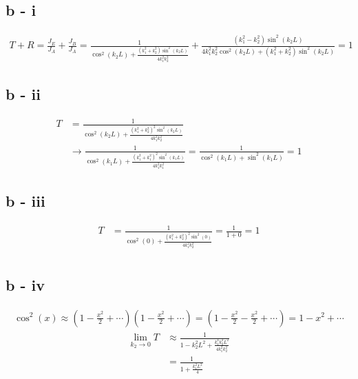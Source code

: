 \documentclass[letter, 10pts]{article}
\begin{document}
\subsection*{b - i}
\begin{align*}
	T + R = \frac{J_E}{J_A} + \frac{J_B}{J_A} =
\frac{1}{
\cos ^2 (k_2 L) 
+ 
\frac{
	(k_1 ^2 + k_2^2) \sin ^2 (k_2 L)
}{4 k_1 ^2 k_2 ^2}
}+ 
\frac{
	(k_1^2 - k_2^2) \sin ^2(k_2 L) 
}{4 k_1 ^2 k_2 ^2 
\cos ^2 (k_2 L) + 
(k_1 ^2 + k_2 ^2) \sin ^2(k_2 L)} = 1
\end{align*}


\subsection*{b - ii} 
\begin{align*}
	T &= 
\frac{1}{
\cos ^2 (k_2 L) 
+ 
\frac{
	(k_1 ^2 + k_2^2)^2 \sin ^2 (k_2 L)
}{4 k_1 ^2 k_2 ^2}
}
	\\ 
	&\to 
\frac{1}{
\cos ^2 (k_1 L) 
+ 
\frac{
	(k_1 ^2 + k_1^2) ^2 \sin ^2 (k_1 L)
}{4 k_1 ^2 k_1 ^2}
} = 
\frac{1}{\cos^2 (k_1 L) + \sin ^2 (k_1 L)} = 1
\end{align*}

\subsection*{b - iii} 
\begin{align*}
T &= \frac{1}{
\cos ^2(0) + \frac{(k_1 ^2 + k_2 ^2) ^2 \sin ^2 (0 ) }{4 k_1 ^2 k_2 ^2}} = \frac{1}{1+ 0} = 1
 \\
\end{align*}


\subsection*{b - iv} 
\begin{align*}
	\cos ^2(x) \approx 
	\left(
1 - \frac{x^2}{2}  + \cdots
	\right) 
	\left(
1 - \frac{x^2}{2}  + \cdots
	\right) 
	= \left(1 - \frac{x^2}{2} - \frac{x^2}{2} + \cdots \right) =  1 - x^2 + \cdots
\end{align*}
\begin{align*}
	\lim_{k_2 \to 0} T &\approx 
\frac{1}{
1  - k_2 ^2 L ^2+ \frac{
k_1^4 k^2_2 L^2
}{4 k_1 ^2 k_2 ^2}
}
\tag{I am only keeping $k_2^2$ terms}
	\\
	&= \frac{1}{1 + \frac{k_1^2 L^2}{4}} \\
\end{align*}
\end{document}
